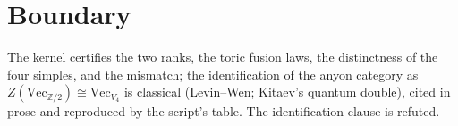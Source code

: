 \documentclass[11pt]{article}
\begin{document}
\section{Boundary}

The kernel certifies the two ranks, the toric fusion laws, the
distinctness of the four simples, and the mismatch; the
identification of the anyon category as $Z(\mathrm{Vec}_{\mathbb{Z}/2})
\cong \mathrm{Vec}_{V_4}$ is classical (Levin--Wen; Kitaev's quantum
double), cited in prose and reproduced by the script's table.  The
identification clause is refuted.
\end{document}
